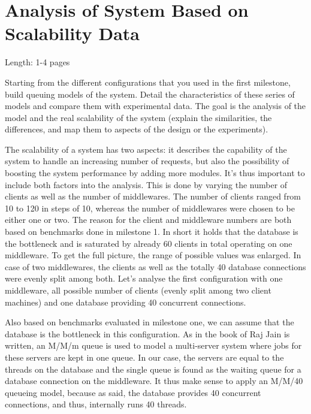\documentclass[11pt]{article}
\begin{document}
\section{Analysis of System Based on Scalability Data}\label{sec:analysis-scalability}

Length: 1-4 pages

Starting from the different configurations that you used in the first milestone, build queuing models of the system. Detail the characteristics of these series of models and compare them with experimental data. The goal is the analysis of the model and the real scalability of the system (explain the similarities, the 
differences, and map them to aspects of the design or the experiments).

The scalability of a system has two aspects: it describes the capability of the system to handle an increasing number of requests, but also the possibility of boosting the system performance by adding more modules. It's thus important to include both factors into the analysis. This is done by varying the number of clients as well as the number of middlewares. The number of clients ranged from 10 to 120 in steps of 10, whereas the number of middlewares were chosen to be either one or two. The reason for the client and middleware numbers are both based on benchmarks done in milestone 1. In short it holds that the database is the bottleneck and is saturated by already 60 clients in total operating on one middleware. To get the full picture, the range of possible values was enlarged. In case of two middlewares, the clients as well as the totally 40 database connections were evenly split among both. Let's analyse the first configuration with one middleware, all possible number of clients (evenly split among two client machines) and one database providing 40 concurrent connections.

Also based on benchmarks evaluated in milestone one, we can assume that the database is the bottleneck in this configuration. As in the book of Raj Jain is written, an M/M/m queue is used to model a multi-server system where jobs for these servers are kept in one queue. In our case, the servers are equal to the threads on the database and the single queue is found as the waiting queue for a database connection on the middleware. It thus make sense to apply an M/M/40 queueing model, because as said, the database provides 40 concurrent connections, and thus, internally runs 40 threads.
\end{document}
